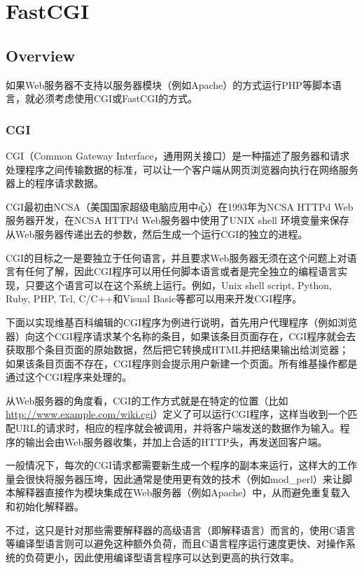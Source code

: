 \part{FastCGI}

\chapter{Overview}


如果Web服务器不支持以服务器模块（例如Apache）的方式运行PHP等脚本语言，就必须考虑使用CGI或FastCGI的方式。

\section{CGI}


CGI（Common Gateway Interface，通用网关接口）是一种描述了服务器和请求处理程序之间传输数据的标准，可以让一个客户端从网页浏览器向执行在网络服务器上的程序请求数据。


CGI最初由NCSA（美国国家超级电脑应用中心）在1993年为NCSA HTTPd Web服务器开发，在NCSA HTTPd Web服务器中使用了UNIX shell 环境变量来保存从Web服务器传递出去的参数，然后生成一个运行CGI的独立的进程。


CGI的目标之一是要独立于任何语言，并且要求Web服务器无须在这个问题上对语言有任何了解，因此CGI程序可以用任何脚本语言或者是完全独立的编程语言实现，只要这个语言可以在这个系统上运行。例如，Unix shell script, Python, Ruby, PHP, Tcl, C/C++和Visual Basic等都可以用来开发CGI程序。

下面以实现维基百科编辑的CGI程序为例进行说明，首先用户代理程序（例如浏览器）向这个CGI程序请求某个名称的条目，如果该条目页面存在，CGI程序就会去获取那个条目页面的原始数据，然后把它转换成HTML并把结果输出给浏览器；如果该条目页面不存在，CGI程序则会提示用户新建一个页面。所有维基操作都是通过这个CGI程序来处理的。


从Web服务器的角度看，CGI的工作方式就是在特定的位置（比如\url{http://www.example.com/wiki.cgi}）定义了可以运行CGI程序，这样当收到一个匹配URL的请求时，相应的程序就会被调用，并将客户端发送的数据作为输入。程序的输出会由Web服务器收集，并加上合适的HTTP头，再发送回客户端。

一般情况下，每次的CGI请求都需要新生成一个程序的副本来运行，这样大的工作量会很快将服务器压垮，因此通常是使用更有效的技术（例如mod\_perl）来让脚本解释器直接作为模块集成在Web服务器（例如Apache）中，从而避免重复载入和初始化解释器。

不过，这只是针对那些需要解释器的高级语言（即解释语言）而言的，使用C语言等编译型语言则可以避免这种额外负荷，而且C语言程序运行速度更快、对操作系统的负荷更小，因此使用编译型语言程序可以达到更高的执行效率。

